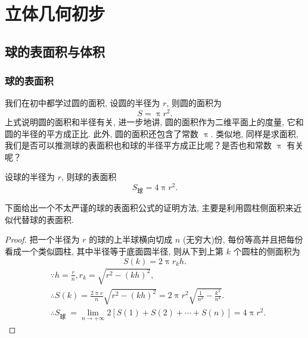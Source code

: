 \chapter{立体几何初步}
\section{球的表面积与体积}
\subsection{球的表面积}
我们在初中都学过圆的面积, 设圆的半径为 $r$, 则圆的面积为
 $$
 S = \uppi r^{2}. 
 $$ 
 上式说明圆的面积和半径有关, 进一步地讲, 圆的面积作为二维平面上的度量, 它和圆的半径的平方成正比. 此外, 圆的面积还包含了常数 $\uppi$. 类似地, 同样是求面积, 我们是否可以推测球的表面积也和球的半径平方成正比呢？是否也和常数 $\uppi$ 有关呢？
\begin{formula}[球的表面积]
	设球的半径为 $r$, 则球的表面积
	$$
		S_{\text{球}}= 4 \uppi r^{2}.
	$$
\end{formula}
下面给出一个不太严谨的球的表面积公式的证明方法, 主要是利用圆柱侧面积来近似代替球的表面积. 
\begin{proof}
  把一个半径为 $r$ 的球的上半球横向切成 $n$ (无穷大)份, 每份等高并且把每份看成一个类似圆柱, 其中半径等于底面圆半径, 则从下到上第 $k$ 个圆柱的侧面积为
  $$
  S(k)=2 \uppi r_k h .
  $$
  $$
  \begin{aligned}
  & \because h=\frac{r}{n}, r_k=\sqrt{r^2-(k h)^2}, \\
  & \therefore S(k)=\frac{2 \uppi r}{n} \sqrt{r^2-(k h)^2}=2 \uppi r^2 \sqrt{\frac{1}{n^2}-\frac{k^2}{n^4}} . \\
  & \therefore S_{\text {球 }}=\lim _{n \rightarrow+\infty} 2[S(1)+S(2)+\cdots+S(n)]=4 \uppi r^2 .
  \end{aligned}
  $$
\end{proof}  

